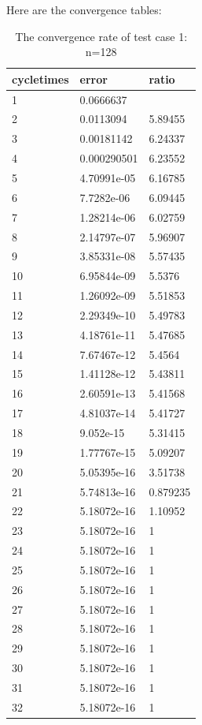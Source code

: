 \documentclass[UTF8]{ctexart}
\theoremstyle{plain}
\theoremstyle{definition}
\theoremstyle{remark}
\begin{document}
Here are the convergence tables:
\begin{table}[H]
\centering
\begin{tabular}{|l|l|l|}
\hline
cycletimes & error & ratio\\\hline
1 & 0.0666637& \\ \hline
2 & 0.0113094& 5.89455\\ \hline
3 & 0.00181142& 6.24337\\ \hline
4 & 0.000290501& 6.23552\\ \hline
5 & 4.70991e-05& 6.16785\\ \hline
6 & 7.7282e-06& 6.09445\\ \hline
7 & 1.28214e-06& 6.02759\\ \hline
8 & 2.14797e-07& 5.96907\\ \hline
9 & 3.85331e-08& 5.57435\\ \hline
10 & 6.95844e-09& 5.5376\\ \hline
11 & 1.26092e-09& 5.51853\\ \hline
12 & 2.29349e-10& 5.49783\\ \hline
13 & 4.18761e-11& 5.47685\\ \hline
14 & 7.67467e-12& 5.4564\\ \hline
15 & 1.41128e-12& 5.43811\\ \hline
16 & 2.60591e-13& 5.41568\\ \hline
17 & 4.81037e-14& 5.41727\\ \hline
18 & 9.052e-15& 5.31415\\ \hline
19 & 1.77767e-15& 5.09207\\ \hline
20 & 5.05395e-16& 3.51738\\ \hline
21 & 5.74813e-16& 0.879235\\ \hline
22 & 5.18072e-16& 1.10952\\ \hline
23 & 5.18072e-16& 1\\ \hline
24 & 5.18072e-16& 1\\ \hline
25 & 5.18072e-16& 1\\ \hline
26 & 5.18072e-16& 1\\ \hline
27 & 5.18072e-16& 1\\ \hline
28 & 5.18072e-16& 1\\ \hline
29 & 5.18072e-16& 1\\ \hline
30 & 5.18072e-16& 1\\ \hline
31 & 5.18072e-16& 1\\ \hline
32 & 5.18072e-16& 1\\ \hline
\end{tabular}
\caption{The convergence rate of test case 1: n=128}
\end{table}
\end{document}
